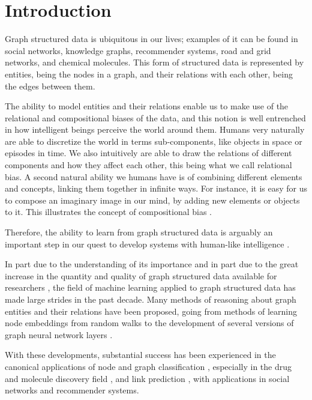 \documentclass[12pt,a4paper]{article}
\begin{document}
	\section{Introduction}
	\label{sec:introduction}
	
	Graph structured data is ubiquitous in our lives; examples of it can be found in social networks, knowledge graphs, recommender systems, road and grid networks, and chemical molecules. This form of structured data is represented by entities, being the nodes in a graph, and their relations with each other, being the edges between them.
	
	The ability to model entities and their relations enable us to make use of the relational and compositional biases of the data, and this notion is well entrenched in how intelligent beings perceive the world around them. Humans very naturally are able to discretize the world in terms sub-components, like objects in space or episodes in time. We also intuitively are able to draw the relations of different components and how they affect each other, this being what we call relational bias. A second natural ability we humans have is of combining different elements and concepts, linking them together in infinite ways. For instance, it is easy for us to compose an imaginary image in our mind, by adding new elements or objects to it. This illustrates the concept of compositional bias \citep{Battaglia2018, Kipf2020}.
	
	Therefore, the ability to learn from graph structured data is arguably an important step in our quest to develop systems with human-like intelligence \citep{Battaglia2018}.
	
	In part due to the understanding of its importance and in part due to the great increase in the quantity and quality of graph structured data available for researchers \citep{Hamilton2020}, the field of machine learning applied to graph structured data has made large strides in the past decade. Many methods of reasoning about graph entities and their relations have been proposed, going from methods of learning node embeddings from random walks \citep{Perozzi2014, Grover2016} to the development of several versions of graph neural network layers \citep{Scarcelli2009, KipfandWelling2016, Gilmer2017, Battaglia2018}.
	
	With these developments, substantial success has been experienced in the canonical applications of node and graph classification \citep{KipfandWelling2017}, especially in the drug and molecule discovery field \citep{Gilmer2017}, and link prediction \citep{KipfandWelling2016}, with applications in social networks and recommender systems.
	
\end{document}
